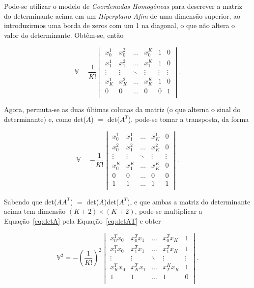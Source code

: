 Pode-se utilizar o modelo de \textit{Coordenadas Homogêneas} para descrever a matriz do determinante acima em um \textit{Hiperplano Afim} de uma dimensão superior, ao introduzirmos uma borda de zeros com um 1 na diagonal, o que não altera o valor do determinante. Obtêm-se, então

\begin{equation}
	\mathbb{V} = \frac{1}{K!} 
	\begin{vmatrix}
	x_0^1 & x^2_{0} & \ldots & x^K_{0} & 1 & 0\\ 
	x^1_{1} & x^2_1 & \ldots & x^K_{1} & 1 & 0\\ 
	\vdots & \vdots & \ddots & \vdots & \vdots & \vdots\\ 
	x^1_{K} & x^2_{K} & \ldots & x_K^K & 1 & 0\\
	0 & 0 & \ldots & 0 & 0 & 1\\ 
	\end{vmatrix}.
	\label{eq:detA}
\end{equation}


Agora, permuta-se as duas últimas colunas da matriz (o que alterna o sinal do determinante) e, como det($A$) $=$ det($A^T$), pode-se tomar a transposta, da forma

\begin{equation}
	\mathbb{V} = -\frac{1}{K!} 
	\begin{vmatrix}
	x_0^1 & x^1_{1} & \ldots & x^1_{K} & 0\\ 
	x^2_0 & x^2_1 & \ldots & x^2_{K} & 0\\ 
	\vdots & \vdots & \ddots & \vdots & \vdots \\ 
	x^K_{0} & x^K_{1} & \ldots & x_K^K & 0\\
	0 & 0 & \ldots & 0 & 0 \\ 
	1 & 1 & \ldots & 1 & 1 \\ 
	\end{vmatrix}.
	\label{eq:detAT}
\end{equation}

Sabendo que det($AA^T$) $=$ det($A$)det($A^T$), e que ambas a matriz do determinante acima tem dimensão $(K+2)\times (K+2)$, pode-se multiplicar a Equação~\ref{eq:detA} pela Equação~\ref{eq:detAT} e obter

\begin{equation*}
\mathbb{V}^2 = -\left( \frac{1}{K!}\right)^2 
\begin{vmatrix}
x_0^Tx_0 & x^T_{0}x_1 & \ldots & x^T_{0}x_K & 1\\ 
x_1^Tx_0 & x^T_1x_1 & \ldots & x^T_{1}x_K & 1\\ 
\vdots & \vdots & \ddots & \vdots & \vdots \\ 
x^T_{K}x_0 & x^T_{K}x_1 & \ldots & x_T^Kx_K & 1\\
1 & 1 & \ldots & 1 & 0\\ 
\end{vmatrix}.
\end{equation*}

